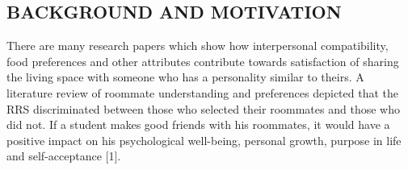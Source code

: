 \documentclass{sig-alternate-05-2015}
\begin{document}
\subsection{BACKGROUND AND MOTIVATION}

There are many research papers which show how interpersonal compatibility, food preferences and other attributes contribute towards satisfaction of sharing the living space with someone who has a personality similar to theirs. A literature review of roommate understanding and preferences depicted that the RRS discriminated between those who selected their roommates and those who did not. If a student makes good friends with his roommates, it would have a positive impact on his psychological well-being, personal growth, purpose in life and self-acceptance [1]. 
\\
\end{document}
